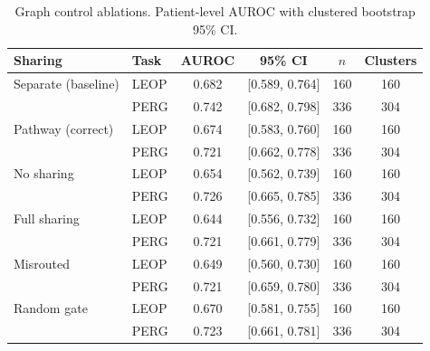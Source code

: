 \begin{table}[htbp]
\centering
\caption{Graph control ablations. Patient-level AUROC with clustered bootstrap 95\% CI.}
\label{tab:graph-controls}
\begin{tabular}{llcccc}
\toprule
Sharing & Task & AUROC & 95\% CI & $n$ & Clusters \\
\midrule
Separate (baseline) & LEOP & 0.682 & [0.589, 0.764] & 160 & 160 \\
 & PERG & 0.742 & [0.682, 0.798] & 336 & 304 \\
 \midrule
Pathway (correct) & LEOP & 0.674 & [0.583, 0.760] & 160 & 160 \\
 & PERG & 0.721 & [0.662, 0.778] & 336 & 304 \\
 \midrule
No sharing & LEOP & 0.654 & [0.562, 0.739] & 160 & 160 \\
 & PERG & 0.726 & [0.665, 0.785] & 336 & 304 \\
 \midrule
Full sharing & LEOP & 0.644 & [0.556, 0.732] & 160 & 160 \\
 & PERG & 0.721 & [0.661, 0.779] & 336 & 304 \\
 \midrule
Misrouted & LEOP & 0.649 & [0.560, 0.730] & 160 & 160 \\
 & PERG & 0.721 & [0.659, 0.780] & 336 & 304 \\
 \midrule
Random gate & LEOP & 0.670 & [0.581, 0.755] & 160 & 160 \\
 & PERG & 0.723 & [0.661, 0.781] & 336 & 304 \\
\bottomrule
\end{tabular}
\end{table}
